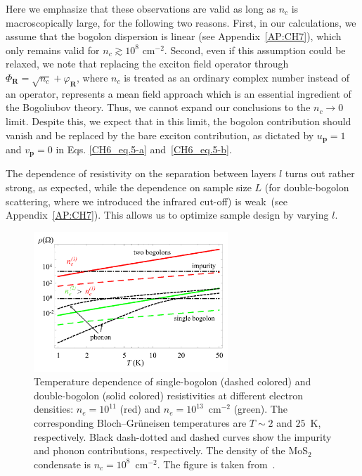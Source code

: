 Here we emphasize that these observations are valid as long as $n_c$ is macroscopically large, for the following two reasons.
First, in our calculations, we assume that the bogolon dispersion is linear (see Appendix~\ref{AP:CH7}), which only remains valid for $n_c\gtrsim 10^8$ cm$^{-2}$. %
Second, even if this assumption could be relaxed, we note that replacing the exciton field operator through $\Phi_\mathbf{R}=\sqrt{n_c}+\varphi_\mathbf{R}$, where $n_c$ is treated as an ordinary complex number instead of an operator, represents a mean field approach which is an essential ingredient of the Bogoliubov theory. %
Thus, we cannot expand our conclusions to the $n_c\rightarrow 0$ limit.
Despite this, we expect that in this limit, the bogolon contribution should vanish and be replaced by the bare exciton contribution, as dictated by $u_{\mathbf{p}}=1$ and $v_{\mathbf{p}}=0$ in Eqs. \eqref{CH6_eq.5-a} and~\eqref{CH6_eq.5-b}.

The dependence of resistivity on the separation between layers $l$ turns out rather strong, as expected, while the dependence on sample size $L$ (for double-bogolon scattering, where we introduced the infrared cut-off) is weak~(see Appendix~\ref{AP:CH7}).
This allows us to optimize sample design by varying $l$.

%
%
%
\begin{figure}[ht]
\centering
\includegraphics[width=0.65\textwidth]{Fig/Ch6/Fig3ER.pdf}
\caption[Resistivities of single- and double-bogolon processes]{Temperature dependence of single-bogolon (dashed colored) and double-bogolon (solid colored) resistivities at different electron densities: $n_e=10^{11}$ (red) and $n_e=10^{13}$~cm$^{-2}$ (green). The corresponding Bloch--Gr\"{u}neisen temperatures are $T\sim2$ and $25$~K, respectively.
Black dash-dotted and dashed curves show the impurity and phonon contributions, respectively.
The density of the MoS$_2$ condensate is $n_c=10^8$~cm$^{-2}$. The figure is taken from~\cite{Villegas:2019aa}.}
\label{CH7_Fig5}
\end{figure}
%
%
%

